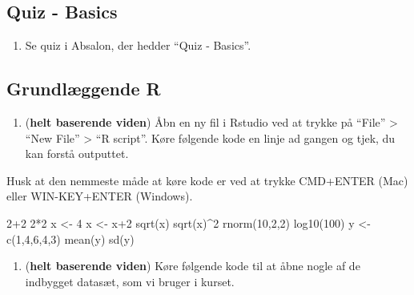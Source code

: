 \documentclass[
]{book}
\newenvironment{Shaded}{\begin{snugshade}}{\end{snugshade}}
\newcommand{\DecValTok}[1]{\textcolor[rgb]{0.00,0.00,0.81}{#1}}
\newcommand{\FunctionTok}[1]{\textcolor[rgb]{0.00,0.00,0.00}{#1}}
\newcommand{\NormalTok}[1]{#1}
\newcommand{\OtherTok}[1]{\textcolor[rgb]{0.56,0.35,0.01}{#1}}
\newcommand{\SpecialCharTok}[1]{\textcolor[rgb]{0.00,0.00,0.00}{#1}}
\providecommand{\tightlist}{%
  \setlength{\itemsep}{0pt}\setlength{\parskip}{0pt}}
\begin{document}
\hypertarget{quiz---basics}{%
\subsection{Quiz - Basics}\label{quiz---basics}}

\begin{enumerate}
\def\labelenumi{\arabic{enumi})}
\tightlist
\item
  Se quiz i Absalon, der hedder ``Quiz - Basics''.
\end{enumerate}

\hypertarget{grundluxe6ggende-r}{%
\subsection{Grundlæggende R}\label{grundluxe6ggende-r}}

\begin{enumerate}
\def\labelenumi{\arabic{enumi})}
\setcounter{enumi}{1}
\tightlist
\item
  (\textbf{helt baserende viden}) Åbn en ny fil i Rstudio ved at trykke på ``File'' \textgreater{} ``New File'' \textgreater{} ``R script''. Køre følgende kode en linje ad gangen og tjek, du kan forstå outputtet.
\end{enumerate}

Husk at den nemmeste måde at køre kode er ved at trykke CMD+ENTER (Mac) eller WIN-KEY+ENTER (Windows).

\begin{Shaded}
\begin{Highlighting}[]
\DecValTok{2}\SpecialCharTok{+}\DecValTok{2}
\DecValTok{2}\SpecialCharTok{*}\DecValTok{2}
\NormalTok{x }\OtherTok{\textless{}{-}} \DecValTok{4}
\NormalTok{x }\OtherTok{\textless{}{-}}\NormalTok{ x}\SpecialCharTok{+}\DecValTok{2}
\FunctionTok{sqrt}\NormalTok{(x)}
\FunctionTok{sqrt}\NormalTok{(x)}\SpecialCharTok{\^{}}\DecValTok{2}
\FunctionTok{rnorm}\NormalTok{(}\DecValTok{10}\NormalTok{,}\DecValTok{2}\NormalTok{,}\DecValTok{2}\NormalTok{)}
\FunctionTok{log10}\NormalTok{(}\DecValTok{100}\NormalTok{)}
\NormalTok{y }\OtherTok{\textless{}{-}}  \FunctionTok{c}\NormalTok{(}\DecValTok{1}\NormalTok{,}\DecValTok{4}\NormalTok{,}\DecValTok{6}\NormalTok{,}\DecValTok{4}\NormalTok{,}\DecValTok{3}\NormalTok{)}
\FunctionTok{mean}\NormalTok{(y)}
\FunctionTok{sd}\NormalTok{(y)}
\end{Highlighting}
\end{Shaded}

\begin{enumerate}
\def\labelenumi{\arabic{enumi})}
\setcounter{enumi}{2}
\tightlist
\item
  (\textbf{helt baserende viden}) Køre følgende kode til at åbne nogle af de indbygget datasæt, som vi bruger i kurset.
\end{enumerate}
\end{document}

